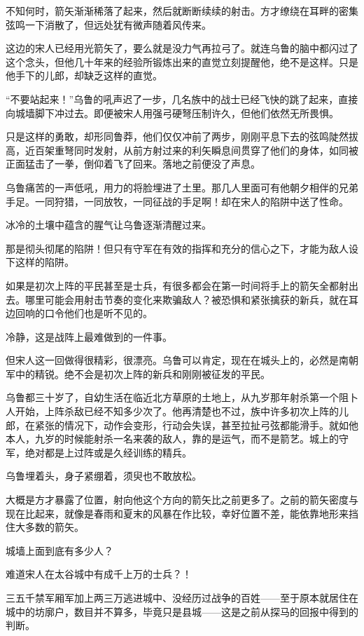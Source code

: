 不知何时，箭矢渐渐稀落了起来，然后就断断续续的射击。方才缭绕在耳畔的密集弦鸣一下消散了，但远处犹有微声随着风传来。

这边的宋人已经用光箭矢了，要么就是没力气再拉弓了。就连乌鲁的脑中都闪过了这个念头，但他几十年来的经验所锻炼出来的直觉立刻提醒他，绝不是这样。只是他手下的儿郎，却缺乏这样的直觉。

“不要站起来！”乌鲁的吼声迟了一步，几名族中的战士已经飞快的跳了起来，直接向城墙脚下冲过去。即便被宋人用强弓硬弩压制许久，但他们依然无所畏惧。

只是这样的勇敢，却形同鲁莽，他们仅仅冲前了两步，刚刚平息下去的弦鸣陡然拔高，近百架重弩同时发射，从前方射过来的利矢瞬息间贯穿了他们的身体，如同被正面猛击了一拳，倒仰着飞了回来。落地之前便没了声息。

乌鲁痛苦的一声低吼，用力的将脸埋进了土里。那几人里面可有他朝夕相伴的兄弟手足。一同狩猎，一同放牧，一同征战的手足啊！却在宋人的陷阱中送了性命。

冰冷的土壤中蕴含的腥气让乌鲁逐渐清醒过来。

那是彻头彻尾的陷阱！但只有守军在有效的指挥和充分的信心之下，才能为敌人设下这样的陷阱。

如果是初次上阵的平民甚至是士兵，有很多都会在第一时间将手上的箭矢全都射出去。哪里可能会用射击节奏的变化来欺骗敌人？被恐惧和紧张擒获的新兵，就在耳边回响的口令他们也是听不见的。

冷静，这是战阵上最难做到的一件事。

但宋人这一回做得很精彩，很漂亮。乌鲁可以肯定，现在在城头上的，必然是南朝军中的精锐。绝不会是初次上阵的新兵和刚刚被征发的平民。

乌鲁都三十岁了，自幼生活在临近北方草原的土地上，从九岁那年射杀第一个阻卜人开始，上阵杀敌已经不知多少次了。他再清楚也不过，族中许多初次上阵的儿郎，在紧张的情况下，动作会变形，行动会失误，甚至拉扯弓弦都能滑手。就如他本人，九岁的时候能射杀一名来袭的敌人，靠的是运气，而不是箭艺。城上的守军，绝对都是上过阵或是久经训练的精兵。

乌鲁埋着头，身子紧绷着，须臾也不敢放松。

大概是方才暴露了位置，射向他这个方向的箭矢比之前更多了。之前的箭矢密度与现在比起来，就像是春雨和夏末的风暴在作比较，幸好位置不差，能依靠地形来挡住大多数的箭矢。

城墙上面到底有多少人？

难道宋人在太谷城中有成千上万的士兵？！

三五千禁军厢军加上两三万逃进城中、没经历过战争的百姓——至于原本就居住在城中的坊廓户，数目并不算多，毕竟只是县城——这是之前从探马的回报中得到的判断。

